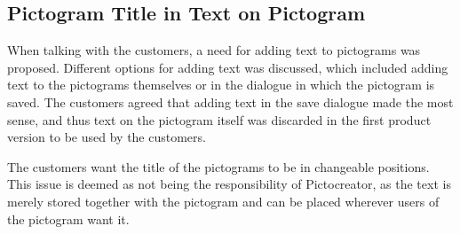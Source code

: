 \subsection{Pictogram Title in Text on Pictogram}
When talking with the customers, a need for adding text to pictograms was proposed. 
Different options for adding text was discussed, which included adding text to the pictograms themselves or in the dialogue in which the pictogram is saved.
The customers agreed that adding text in the save dialogue made the most sense, and thus text on the pictogram itself was discarded in the first product version to be used by the customers.

The customers want the title of the pictograms to be in changeable positions. 
This issue is deemed as not being the responsibility of Pictocreator, as the text is merely stored together with the pictogram and can be placed wherever users of the pictogram want it.